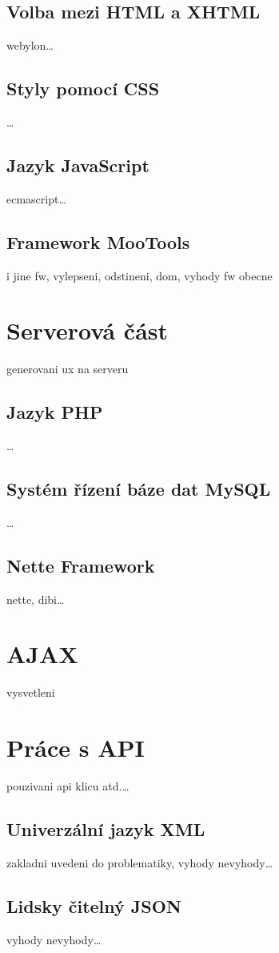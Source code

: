 \subsection{Volba mezi HTML a XHTML}
webylon\ldots

\subsection{Styly pomocí CSS}
\ldots

\subsection{Jazyk JavaScript}
ecmascript\ldots

\subsection{Framework MooTools}
i jine fw, vylepseni, odstineni, dom, vyhody fw obecne

\section{Serverová část}
generovani ux na serveru
\subsection{Jazyk PHP}
\ldots
\subsection{Systém řízení báze dat MySQL}
\ldots
\subsection{Nette Framework}
nette, dibi\ldots

\section{AJAX}
vysvetleni

\section{Práce s API}
pouzivani api klicu atd.\ldots
\subsection{Univerzální jazyk XML}
zakladni uvedeni do problematiky, vyhody nevyhody\ldots
\subsection{Lidsky čitelný JSON}
vyhody nevyhody\ldots

